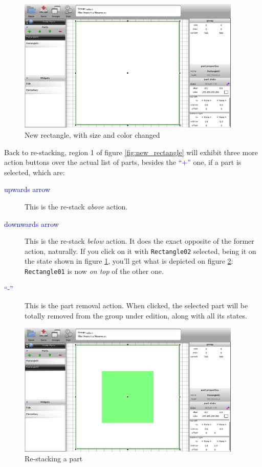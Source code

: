 \documentclass[a4paper]{profusion}
\newcommand{\GUIIcon}[1]{\textcolor{blue}{#1}}    %
\begin{document}
\begin{figure}[h!]
  \centering
  \includegraphics[width=0.95\textwidth]{images/rectangle_stack_pre.png}
  \caption{New rectangle, with size and color changed}
  \label{fig:restack_pre}
\end{figure}

Back to re-stacking, region 1 of figure \ref{fig:new_rectangle} will
exhibit three more action buttons over the actual list of parts,
besides the \GUIIcon{``+''} one, if a part is selected, which are:

\begin{description}
\item[\GUIIcon{upwards arrow}] This is the re-stack \emph{above}
  action.
\item[\GUIIcon{downwards arrow}] This is the re-stack \emph{below}
  action. It does the exact opposite of the former action,
  naturally. If you click on it with \texttt{Rectangle02} selected,
  being it on the state shown in figure \ref{fig:restack_pre}, you'll
  get what is depicted on figure \ref{fig:restack}:
  \texttt{Rectangle01} is now \emph{on top} of the other one.
\item[\GUIIcon{``-''}] This is the part removal action. When clicked,
  the selected part will be totally removed from the group under
  edition, along with all its states.
\end{description}

\begin{figure}[h!]
  \centering
  \includegraphics[width=0.95\textwidth]{images/rectangle_stack.png}
  \caption{Re-stacking a part}
  \label{fig:restack}
\end{figure}
\end{document}
